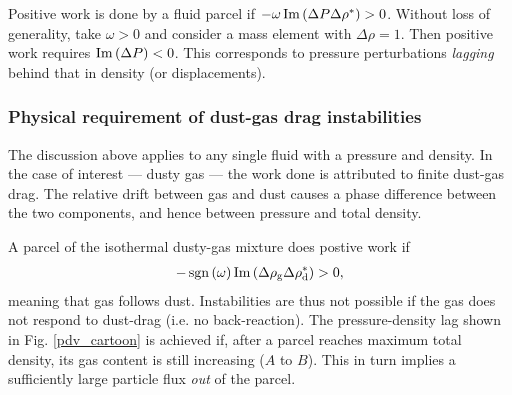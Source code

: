 Positive work is done by a fluid parcel if $-\omega \operatorname{Im}\left(\Delta  
P\Delta\rho^*\right)>0$. Without loss of generality, take $\omega>0$
and consider a mass element with $\Delta\rho = 1$. Then positive work 
requires $\operatorname{Im}\left(\Delta
P\right)<0$.  This corresponds to pressure perturbations \emph{lagging}
behind that in density (or displacements).%



\subsubsection{Physical requirement of dust-gas drag instabilities}  




The discussion above applies to any single fluid with a pressure and
density. In the case of interest --- dusty gas --- the work done 
is attributed to finite dust-gas drag. 
The relative 
drift between gas and dust causes a phase difference between the two
components, and hence between pressure and total density. 

A parcel of the isothermal dusty-gas mixture does 
postive work if  
\begin{align*}
-\operatorname{sgn}\left(\omega\right)\operatorname{Im}\left(\Delta\rho_\mathrm{g}\Delta\rho_\mathrm{d}^*\right)>0,
\end{align*}
meaning that gas follows dust. Instabilities are thus not possible if the
gas does not respond to dust-drag (i.e. no back-reaction). The
pressure-density lag shown in Fig. \ref{pdv_cartoon} is achieved if, 
after a parcel reaches maximum total density, its 
gas content is still increasing ($A$ to $B$). This in turn implies a sufficiently
large particle flux \emph{out} of the parcel.   

